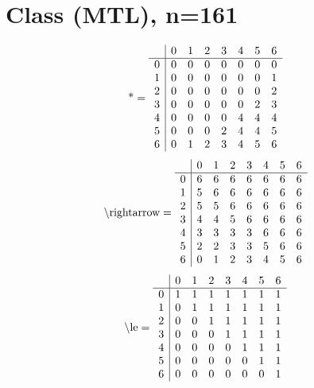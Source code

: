 \documentclass[11pt]{article}
\begin{document}
\section{Class (MTL), n=161}
\[\text{*} = 
\begin{array}{r | r r r r r r r}
 & 0 & 1 & 2 & 3 & 4 & 5 & 6 \\ \hline
0 & 0 & 0 & 0 & 0 & 0 & 0 & 0 \\
1 & 0 & 0 & 0 & 0 & 0 & 0 & 1 \\
2 & 0 & 0 & 0 & 0 & 0 & 0 & 2 \\
3 & 0 & 0 & 0 & 0 & 0 & 2 & 3 \\
4 & 0 & 0 & 0 & 0 & 4 & 4 & 4 \\
5 & 0 & 0 & 0 & 2 & 4 & 4 & 5 \\
6 & 0 & 1 & 2 & 3 & 4 & 5 & 6 \\
\end{array}
\]
\[\text{\textbackslash rightarrow} = 
\begin{array}{r | r r r r r r r}
 & 0 & 1 & 2 & 3 & 4 & 5 & 6 \\ \hline
0 & 6 & 6 & 6 & 6 & 6 & 6 & 6 \\
1 & 5 & 6 & 6 & 6 & 6 & 6 & 6 \\
2 & 5 & 5 & 6 & 6 & 6 & 6 & 6 \\
3 & 4 & 4 & 5 & 6 & 6 & 6 & 6 \\
4 & 3 & 3 & 3 & 3 & 6 & 6 & 6 \\
5 & 2 & 2 & 3 & 3 & 5 & 6 & 6 \\
6 & 0 & 1 & 2 & 3 & 4 & 5 & 6 \\
\end{array}
\]
\[\text{\textbackslash le} = 
\begin{array}{r | r r r r r r r}
 & 0 & 1 & 2 & 3 & 4 & 5 & 6 \\ \hline
0 & 1 & 1 & 1 & 1 & 1 & 1 & 1 \\
1 & 0 & 1 & 1 & 1 & 1 & 1 & 1 \\
2 & 0 & 0 & 1 & 1 & 1 & 1 & 1 \\
3 & 0 & 0 & 0 & 1 & 1 & 1 & 1 \\
4 & 0 & 0 & 0 & 0 & 1 & 1 & 1 \\
5 & 0 & 0 & 0 & 0 & 0 & 1 & 1 \\
6 & 0 & 0 & 0 & 0 & 0 & 0 & 1 \\
\end{array}
\]
\end{document}
